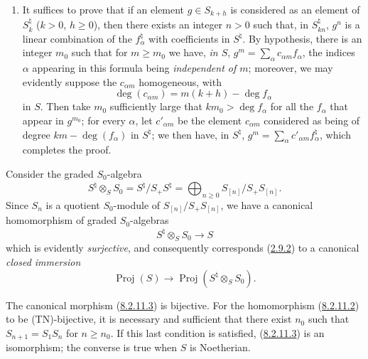 \begin{enumerate}
\item[\rm(iv)] It suffices to prove that if an element $g\in S_{k+h}$ is
considered as an element of $S_k^\natural$ ($k>0$, $h\geq0$), then there
exists an integer $n>0$ such that, in $S_{kn}^\natural$, $g^n$ is a linear
combination of the $f_\alpha^\natural$ with coefficients in $S^\natural$. By
hypothesis, there is an integer $m_0$ such that for $m\geq m_0$ we have, \emph{in
$S$}, $g^m=\sum_\alpha c_{\alpha m}f_\alpha$, the indices $\alpha$ appearing
in this formula being \emph{independent of $m$}; moreover, we may
evidently suppose the $c_{\alpha m}$ homogeneous, with
\[
  \deg(c_{\alpha m})=m(k+h)-\deg f_\alpha
\]
in $S$. Then take $m_0$ sufficiently large that
$km_0>\deg f_\alpha$ for all the $f_\alpha$ that appear in $g^{m_0}$;
for every $\alpha$, let $c'_{\alpha m}$ be the element $c_{\alpha m}$ considered
as being of degree $km-\deg(f_\alpha)$ in $S^\natural$; we then have, in
$S^\natural$, $g^m=\sum_\alpha c'_{\alpha m}f_\alpha^\natural$, which
completes the proof.
\end{enumerate}

\begin{env}[8.2.11]
\label{II.8.2.11}
Consider the graded $S_0$-algebra
\begin{equation}
\label{II.8.2.11.1}
  S^\natural\otimes_S S_0=S^\natural/S_+S^\natural
  =\bigoplus_{n\geq0}S_{[n]}/S_+S_{[n]}.
\tag{8.2.11.1}
\end{equation}
Since $S_n$ is a quotient $S_0$-module of $S_{[n]}/S_+S_{[n]}$, we have a
canonical homomorphism of graded $S_0$-algebras
\begin{equation}
\label{II.8.2.11.2}
  S^\natural\otimes_S S_0\to S
\tag{8.2.11.2}
\end{equation}
which is evidently \emph{surjective}, and consequently corresponds
(\hyperref[II.2.9.2]{2.9.2}) to a canonical \emph{closed immersion}
\begin{equation}
\label{II.8.2.11.3}
  \operatorname{Proj}(S)\to
  \operatorname{Proj}(S^\natural\otimes_S S_0).
\tag{8.2.11.3}
\end{equation}
\end{env}


\begin{proposition}[8.2.12]
\label{II.8.2.12}
The canonical morphism (\hyperref[II.8.2.11.3]{8.2.11.3}) is bijective.
For the homomorphism (\hyperref[II.8.2.11.2]{8.2.11.2}) to be
(TN)-bijective, it is necessary and sufficient that there exist $n_0$ such that
$S_{n+1}=S_1S_n$ for $n\geq n_0$. If this last condition is satisfied,
(\hyperref[II.8.2.11.3]{8.2.11.3}) is an isomorphism; the converse is
true when $S$ is Noetherian.
\end{proposition}


